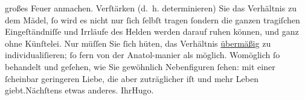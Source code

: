 \begin{ledgroupsized}[t]{13cm}
                    großes Feuer anmachen. {\pb}Verſtärken \introOben{}(d. h. determinieren)\introOben{}
               Sie das Verhältnis
                    zu dem Mädel, ſo wird es nicht nur ſich ſelbſt tragen ſondern die ganzen
                    tragiſchen Eingeſtändniſſe und Irrläufe des Helden werden darauf ruhen können,
                    und ganz ohne Künſtelei. Nur müſſen Sie ſich hüten, das Verhältnis \uline{übermäßig} zu individualiſieren; ſo fern von der
                        Anatol-manier als möglich.\pend
           \pstart
           Womöglich ſo behandelt und geſehen, wie Sie gewöhnlich Nebenfiguren ſehen: mit
                    einer ſcheinbar geringeren Liebe, die aber zuträglicher iſt und mehr Leben
                        giebt.\hspace*{2.5em}Nächſtens etwas anderes.\pend
           \pstart Ihr\spacefill\mbox{Hugo.}\pend{}\endnumbering{}\end{ledgroupsized}  \newcommand{\dateiname}{L00564}\newcommand{\titel}{Hugo von Hofmannsthal an Arthur Schnitzler, 16. 7. [1896]}\newcommand{\editorInnen}{Martin Anton Müller und Gerd-Hermann Susen}
      
